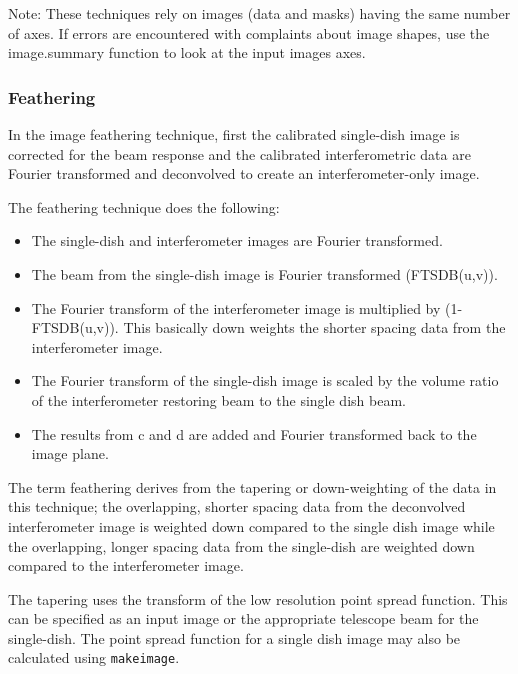 Note: These techniques rely on images (data and masks) having the same
number of axes. If errors are encountered with complaints about image
shapes, use the image.summary function to look at the input images
axes.


\subsubsection{Feathering}
\label{subsubsection:synth.im.feather}

In the image feathering technique, first the calibrated single-dish
image is corrected for the beam response and the calibrated
interferometric data are Fourier transformed and deconvolved to create
an interferometer-only image.

The feathering technique does the following:

\begin{itemize}
\item The single-dish and interferometer images are Fourier
      transformed.
\item The beam from the single-dish image is Fourier transformed
      (FTSDB(u,v)).
\item The Fourier transform of the interferometer image is multiplied
      by (1-FTSDB(u,v)).  This basically down weights the shorter
      spacing data from the interferometer image.
\item The Fourier transform of the single-dish image is scaled by the
      volume ratio of the interferometer restoring beam to the single
      dish beam.
\item The results from c and d are added and Fourier transformed
      back to the image plane.
\end{itemize}

The term feathering derives from the tapering or down-weighting of the
data in this technique; the overlapping, shorter spacing data from the
deconvolved interferometer image is weighted down compared to the
single dish image while the overlapping, longer spacing data from the
single-dish are weighted down compared to the interferometer image.

The tapering uses the transform of the low resolution point spread
function. This can be specified as an input image or the appropriate
telescope beam for the single-dish.  The point spread function for a
single dish image may also be calculated using {\tt makeimage}.

